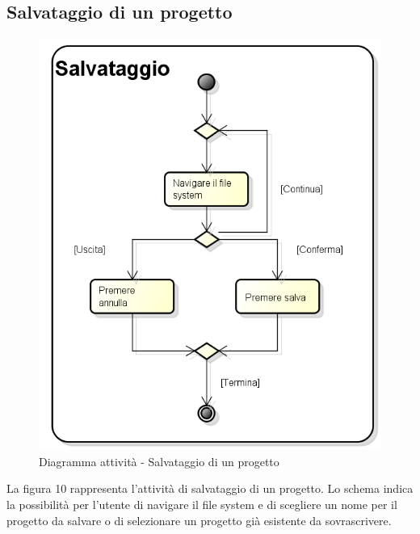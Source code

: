 \subsection{Salvataggio di un progetto}
\begin{figure}[h] 
	\centering 
	\includegraphics[scale=0.3] {img/activity_salvataggio.png} 
	\caption{Diagramma attività - Salvataggio di un progetto} 
\end{figure}
La figura 10 rappresenta l'attività di salvataggio di un progetto. Lo schema indica la possibilità per l'utente di navigare il file system e di scegliere un nome per il progetto da salvare o di selezionare un progetto già esistente da sovrascrivere.
\newpage